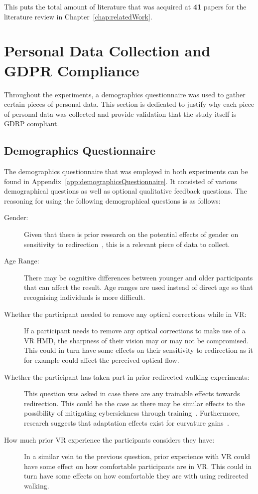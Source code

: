 This puts the total amount of literature that was acquired at \textbf{41} papers for the literature review in Chapter~\ref{chap:relatedWork}.

\section{Personal Data Collection and GDPR Compliance}
Throughout the experiments, a demographics questionnaire was used to gather certain pieces of personal data. This section is dedicated to justify why each piece of personal data was collected and provide validation that the study itself is GDRP compliant. 

\subsection{Demographics Questionnaire}
The demographics questionnaire that was employed in both experiments can be found in Appendix~\ref{app:demographicsQuestionnaire}. It consisted of various demographical questions as well as optional qualitative feedback questions. The reasoning for using the following demographical questions is as follows:

\begin{description}
   \item[Gender:] Given that there is prior research on the potential effects of gender on sensitivity to redirection~\cite{nguyen2018individual}, this is a relevant piece of data to collect. 
   \item[Age Range:] There may be cognitive differences between younger and older participants that can affect the result. Age ranges are used instead of direct age so that recognising individuals is more difficult. 
   \item[Whether the participant needed to remove any optical corrections while in VR:] If a participant needs to remove any optical corrections to make use of a VR HMD, the sharpness of their vision may or may not be compromised. This could in turn have some effects on their sensitivity to redirection as it for example could affect the perceived optical flow. 
   \item[Whether the participant has taken part in prior redirected walking experiments:] This question was asked in case there are any trainable effects towards redirection. This could be the case as there may be similar effects to the possibility of mitigating cybersickness through training~\cite{hildebrandt2018get}. Furthermore, research suggests that adaptation effects exist for curvature gains~\cite{nguyen2018individual}.
   \item[How much prior VR experience the participants considers they have:] In a similar vein to the previous question, prior experience with VR could have some effect on how comfortable participants are in VR. This could in turn have some effects on how comfortable they are with using redirected walking.
\end{description}

